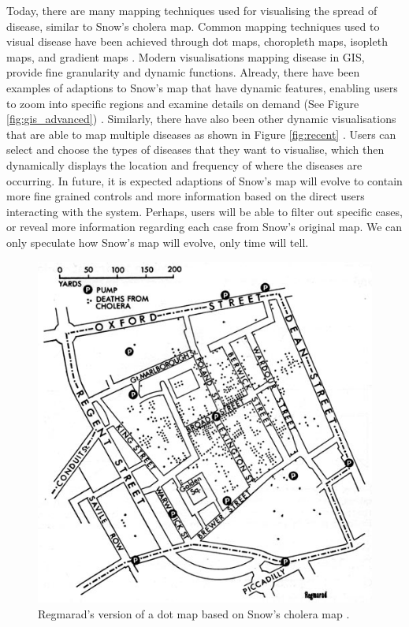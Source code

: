 \documentclass[12pt]{article}
\begin{document}
Today, there are many mapping techniques used for visualising the spread of disease, similar to Snow's cholera map. Common mapping techniques used to visual disease have been achieved through dot maps, choropleth maps, isopleth maps, and gradient maps \cite{recent}. Modern visualisations mapping disease in GIS, provide fine granularity and dynamic functions. Already, there have been examples of adaptions to Snow's map that have dynamic features, enabling users to zoom into specific regions and examine details on demand (See Figure \ref{fig:gis_advanced}) \cite{advanced}. Similarly, there have also been other dynamic visualisations that are able to map multiple diseases as shown in Figure \ref{fig:recent} \cite{recent}. Users can select and choose the types of diseases that they want to visualise, which then dynamically displays the location and frequency of where the diseases are occurring. In future, it is expected adaptions of Snow's map will evolve to contain more fine grained controls and more information based on the direct users interacting with the system. Perhaps, users will be able to filter out specific cases, or reveal more information regarding each case from Snow's original map. We can only speculate how Snow's map will evolve, only time will tell. 

\begin{figure}
\centering
\includegraphics[scale=15.0]{snowmap1_regmarad}
\caption{Regmarad's version of a dot map based on Snow's cholera map \cite{ralph}.
}
\label{fig:reg}
\end{figure}
\end{document}
